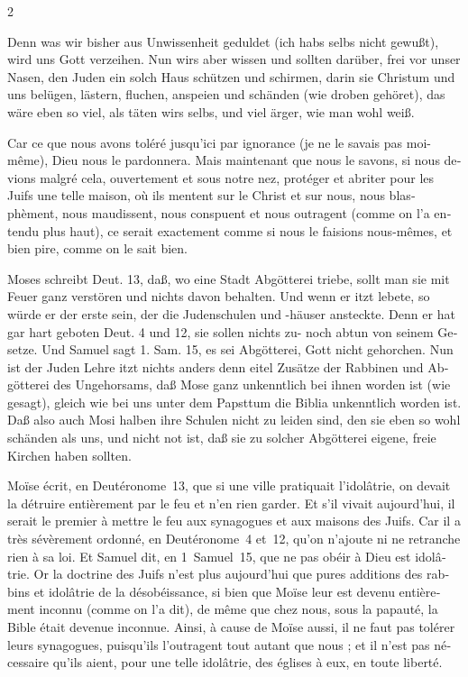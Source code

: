\documentclass[a4paper,12pt]{article}
\newcommand\chunks[2]{%
\begin{leftcolumn*}\begin{otherlanguage}{german}%
{#1}%
\end{otherlanguage}\end{leftcolumn*}%
\begin{rightcolumn}\begin{otherlanguage}{french}%
{#2}%
\end{otherlanguage}\end{rightcolumn}%
}
\begin{document}
\begin{paracol}{2}
  \chunks{Denn was wir bisher aus Unwissenheit geduldet (ich habs selbs nicht gewußt), wird uns Gott verzeihen. Nun wirs aber wissen und sollten darüber, frei vor unser Nasen, den Juden ein solch Haus schützen und schirmen, darin sie Christum und uns belügen, lästern, fluchen, anspeien und schänden (wie droben gehöret), das wäre eben so viel, als täten wirs selbs, und viel ärger, wie man wohl weiß.}
         {Car ce que nous avons toléré jusqu’ici par ignorance (je ne le savais pas moi-même), Dieu nous le pardonnera. Mais maintenant que nous le savons, si nous devions malgré cela, ouvertement et sous notre nez, protéger et abriter pour les Juifs une telle maison, où ils mentent sur le Christ et sur nous, nous blasphèment, nous maudissent, nous conspuent et nous outragent (comme on l’a entendu plus haut), ce serait exactement comme si nous le faisions nous-mêmes, et bien pire, comme on le sait bien.}
  \chunks{Moses schreibt Deut. 13, daß, wo eine Stadt Abgötterei triebe, sollt man sie mit Feuer ganz verstören und nichts davon behalten. Und wenn er itzt lebete, so würde er der erste sein, der die Judenschulen und -häuser ansteckte. Denn er hat gar hart geboten Deut. 4 und 12, sie sollen nichts zu- noch abtun von seinem Gesetze. Und Samuel sagt 1. Sam. 15, es sei Abgötterei, Gott nicht gehorchen. Nun ist der Juden Lehre itzt nichts anders denn eitel Zusätze der Rabbinen und Abgötterei des Ungehorsams, daß Mose ganz unkenntlich bei ihnen worden ist (wie gesagt), gleich wie bei uns unter dem Papsttum die Biblia unkenntlich worden ist. Daß also auch Mosi halben ihre Schulen nicht zu leiden sind, den sie eben so wohl schänden als uns, und nicht not ist, daß sie zu solcher Abgötterei eigene, freie Kirchen haben sollten.}
         {Moïse écrit, en Deutéronome~13, que si une ville pratiquait l’idolâtrie, on devait la détruire entièrement par le feu et n’en rien garder. Et s’il vivait aujourd’hui, il serait le premier à mettre le feu aux synagogues et aux maisons des Juifs. Car il a très sévèrement ordonné, en Deutéronome~4 et~12, qu’on n’ajoute ni ne retranche rien à sa loi. Et Samuel dit, en 1~Samuel~15, que ne pas obéir à Dieu est idolâtrie. Or la doctrine des Juifs n’est plus aujourd’hui que pures additions des rabbins et idolâtrie de la désobéissance, si bien que Moïse leur est devenu entièrement inconnu (comme on l’a dit), de même que chez nous, sous la papauté, la Bible était devenue inconnue. Ainsi, à cause de Moïse aussi, il ne faut pas tolérer leurs synagogues, puisqu’ils l’outragent tout autant que nous ; et il n’est pas nécessaire qu’ils aient, pour une telle idolâtrie, des églises à eux, en toute liberté.}

\end{paracol}
\end{document}
